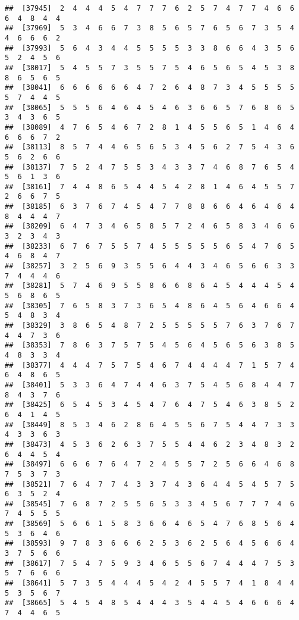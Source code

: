 \documentclass[
]{book}
\begin{document}
\begin{verbatim}
##  [37945]  2  4  4  4  5  4  7  7  7  6  2  5  7  4  7  7  4  6  6  6  4  8  4  4
##  [37969]  5  3  4  6  6  7  3  8  5  6  5  7  6  5  6  7  3  5  4  4  6  6  6  2
##  [37993]  5  6  4  3  4  4  5  5  5  5  3  3  8  6  6  4  3  5  6  5  2  4  5  6
##  [38017]  5  4  5  5  7  3  5  5  7  5  4  6  5  6  5  4  5  3  8  8  6  5  6  5
##  [38041]  6  6  6  6  6  6  4  7  2  6  4  8  7  3  4  5  5  5  5  5  7  4  4  5
##  [38065]  5  5  5  6  4  6  4  5  4  6  3  6  6  5  7  6  8  6  5  3  4  3  6  5
##  [38089]  4  7  6  5  4  6  7  2  8  1  4  5  5  6  5  1  4  6  4  6  6  6  7  2
##  [38113]  8  5  7  4  4  6  5  6  5  3  4  5  6  2  7  5  4  3  6  5  6  2  6  6
##  [38137]  7  5  2  4  7  5  5  3  4  3  3  7  4  6  8  7  6  5  4  5  6  1  3  6
##  [38161]  7  4  4  8  6  5  4  4  5  4  2  8  1  4  6  4  5  5  7  2  6  6  7  5
##  [38185]  6  3  7  6  7  4  5  4  7  7  8  8  6  6  4  6  4  6  4  8  4  4  4  7
##  [38209]  6  4  7  3  4  6  5  8  5  7  2  4  6  5  8  3  4  6  6  3  2  3  4  3
##  [38233]  6  7  6  7  5  5  7  4  5  5  5  5  5  6  5  4  7  6  5  4  6  8  4  7
##  [38257]  3  2  5  6  9  3  5  5  6  4  4  3  4  6  5  6  6  3  3  7  4  4  4  6
##  [38281]  5  7  4  6  9  5  5  8  6  6  8  6  4  5  4  4  4  5  4  5  6  8  6  5
##  [38305]  7  6  5  8  3  7  3  6  5  4  8  6  4  5  6  4  6  6  4  5  4  8  3  4
##  [38329]  3  8  6  5  4  8  7  2  5  5  5  5  5  7  6  3  7  6  7  4  4  7  3  6
##  [38353]  7  8  6  3  7  5  7  5  4  5  6  4  5  6  5  6  3  8  5  4  8  3  3  4
##  [38377]  4  4  4  7  5  7  5  4  6  7  4  4  4  4  7  1  5  7  4  6  4  8  6  5
##  [38401]  5  3  3  6  4  7  4  4  6  3  7  5  4  5  6  8  4  4  7  8  4  3  7  6
##  [38425]  6  5  4  5  3  4  5  4  7  6  4  7  5  4  6  3  8  5  2  6  4  1  4  5
##  [38449]  8  5  3  4  6  2  8  6  4  5  5  6  7  5  4  4  7  3  3  4  3  3  6  3
##  [38473]  4  5  3  6  2  6  3  7  5  5  4  4  6  2  3  4  8  3  2  6  4  4  5  4
##  [38497]  6  6  6  7  6  4  7  2  4  5  5  7  2  5  6  6  4  6  8  7  5  3  7  3
##  [38521]  7  6  4  7  7  4  3  3  7  4  3  6  4  4  5  4  5  7  5  6  3  5  2  4
##  [38545]  7  6  8  7  2  5  5  6  5  3  3  4  5  6  7  7  7  4  6  7  4  5  5  5
##  [38569]  5  6  6  1  5  8  3  6  6  4  6  5  4  7  6  8  5  6  4  5  3  6  4  6
##  [38593]  9  7  8  3  6  6  6  2  5  3  6  2  5  6  4  5  6  6  4  3  7  5  6  6
##  [38617]  7  5  4  7  5  9  3  4  6  5  5  6  7  4  4  4  7  5  3  5  7  6  6  6
##  [38641]  5  7  3  5  4  4  4  5  4  2  4  5  5  7  4  1  8  4  4  5  3  5  6  7
##  [38665]  5  4  5  4  8  5  4  4  4  3  5  4  4  5  4  6  6  6  4  7  4  4  6  5

\end{verbatim}
\end{document}
